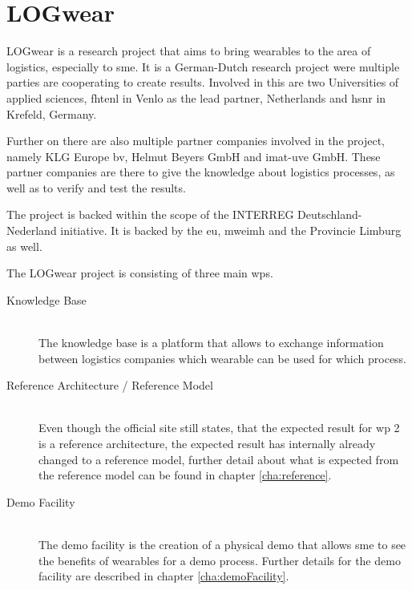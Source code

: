 \section{LOGwear}\label{sec:logwear}
LOGwear is a research project that aims to bring wearables to the area of logistics, especially to \gls{sme}. It is a German-Dutch research project were multiple parties are cooperating to create results. Involved in this are two Universities of applied sciences, \gls{fhtenl} in Venlo as the lead partner, Netherlands and \gls{hsnr} in Krefeld, Germany.

Further on there are also multiple partner companies involved in the project, namely KLG Europe bv, Helmut Beyers GmbH and imat-uve GmbH. These partner companies are there to give the knowledge about logistics processes, as well as to verify and test the results.

The project is backed within the scope of the INTERREG Deutschland-Nederland initiative. It is backed by the \gls{eu}, \gls{mweimh} and the Provincie Limburg as well.

The LOGwear project is consisting of three main \gls{wp}s. \cite{website:logwear}
\begin{description}
	\item[Knowledge Base] \hfill \\
		The knowledge base is a platform that allows to exchange information between logistics companies which wearable can be used for which process. \cite{bachelorThesis:oliver} \cite{bachelorThesis:sascha}
	\item[Reference Architecture / Reference Model] \hfill \\
		Even though the official site still states, that the expected result for \gls{wp} 2 is a reference architecture, the expected result has internally already changed to a reference model, further detail about what is expected from the reference model can be found in chapter \ref{cha:reference}.
	\item[Demo Facility] \hfill \\
		The demo facility is the creation of a physical demo that allows \gls{sme} to see the benefits of wearables for a demo process. Further details for the demo facility are described in chapter \ref{cha:demoFacility}.
\end{description}